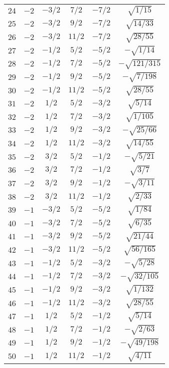 \begin{table}
\begin{center}
\begin{tabular}{|c|c|c|c|c|c|}
$24$ & $-2$ & $-3/2$ & $7/2$ & $-7/2$ & $\sqrt{1/15}$ \\ 
$25$ & $-2$ & $-3/2$ & $9/2$ & $-7/2$ & $\sqrt{14/33}$ \\ 
$26$ & $-2$ & $-3/2$ & $11/2$ & $-7/2$ & $\sqrt{28/55}$ \\ 
$27$ & $-2$ & $-1/2$ & $5/2$ & $-5/2$ & $-\sqrt{1/14}$ \\ 
$28$ & $-2$ & $-1/2$ & $7/2$ & $-5/2$ & $-\sqrt{121/315}$ \\ 
$29$ & $-2$ & $-1/2$ & $9/2$ & $-5/2$ & $-\sqrt{7/198}$ \\ 
$30$ & $-2$ & $-1/2$ & $11/2$ & $-5/2$ & $\sqrt{28/55}$ \\ 
$31$ & $-2$ & $1/2$ & $5/2$ & $-3/2$ & $\sqrt{5/14}$ \\ 
$32$ & $-2$ & $1/2$ & $7/2$ & $-3/2$ & $\sqrt{1/105}$ \\ 
$33$ & $-2$ & $1/2$ & $9/2$ & $-3/2$ & $-\sqrt{25/66}$ \\ 
$34$ & $-2$ & $1/2$ & $11/2$ & $-3/2$ & $\sqrt{14/55}$ \\ 
$35$ & $-2$ & $3/2$ & $5/2$ & $-1/2$ & $-\sqrt{5/21}$ \\ 
$36$ & $-2$ & $3/2$ & $7/2$ & $-1/2$ & $\sqrt{3/7}$ \\ 
$37$ & $-2$ & $3/2$ & $9/2$ & $-1/2$ & $-\sqrt{3/11}$ \\ 
$38$ & $-2$ & $3/2$ & $11/2$ & $-1/2$ & $\sqrt{2/33}$ \\ 
$39$ & $-1$ & $-3/2$ & $5/2$ & $-5/2$ & $\sqrt{1/84}$ \\ 
$40$ & $-1$ & $-3/2$ & $7/2$ & $-5/2$ & $\sqrt{6/35}$ \\ 
$41$ & $-1$ & $-3/2$ & $9/2$ & $-5/2$ & $\sqrt{21/44}$ \\ 
$42$ & $-1$ & $-3/2$ & $11/2$ & $-5/2$ & $\sqrt{56/165}$ \\ 
$43$ & $-1$ & $-1/2$ & $5/2$ & $-3/2$ & $-\sqrt{5/28}$ \\ 
$44$ & $-1$ & $-1/2$ & $7/2$ & $-3/2$ & $-\sqrt{32/105}$ \\ 
$45$ & $-1$ & $-1/2$ & $9/2$ & $-3/2$ & $\sqrt{1/132}$ \\ 
$46$ & $-1$ & $-1/2$ & $11/2$ & $-3/2$ & $\sqrt{28/55}$ \\ 
$47$ & $-1$ & $1/2$ & $5/2$ & $-1/2$ & $\sqrt{5/14}$ \\ 
$48$ & $-1$ & $1/2$ & $7/2$ & $-1/2$ & $-\sqrt{2/63}$ \\ 
$49$ & $-1$ & $1/2$ & $9/2$ & $-1/2$ & $-\sqrt{49/198}$ \\ 
$50$ & $-1$ & $1/2$ & $11/2$ & $-1/2$ & $\sqrt{4/11}$ \\ 

\end{tabular}
\end{center}
\end{table}
